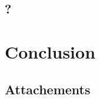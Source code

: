 \documentclass[11pt,oneside]{fithesis2}
\begin{document}
\section{?}

\chapter{Conclusion}

\begin{thebibliography}{}

\end{thebibliography}

\begin{appendix}
	\chapter{Attachements}
\end{appendix}
\end{document}

